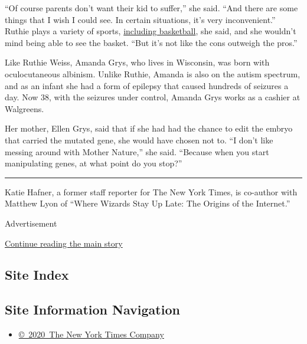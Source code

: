 ``Of course parents don't want their kid to suffer,'' she said. ``And
there are some things that I wish I could see. In certain situations,
it's very inconvenient.'' Ruthie plays a variety of sports,
\href{https://twitter.com/ethanjweiss/status/1056641212256477184?lang=en}{including
basketball}, she said, and she wouldn't mind being able to see the
basket. ``But it's not like the cons outweigh the pros.''

Like Ruthie Weiss, Amanda Grys, who lives in Wisconsin, was born with
oculocutaneous albinism. Unlike Ruthie, Amanda is also on the autism
spectrum, and as an infant she had a form of epilepsy that caused
hundreds of seizures a day. Now 38, with the seizures under control,
Amanda Grys works as a cashier at Walgreens.

Her mother, Ellen Grys, said that if she had had the chance to edit the
embryo that carried the mutated gene, she would have chosen not to. ``I
don't like messing around with Mother Nature,'' she said. ``Because when
you start manipulating genes, at what point do you stop?''

\begin{center}\rule{0.5\linewidth}{\linethickness}\end{center}

Katie Hafner, a former staff reporter for The New York Times, is
co-author with Matthew Lyon of ``Where Wizards Stay Up Late: The Origins
of the Internet.''

Advertisement

\protect\hyperlink{after-bottom}{Continue reading the main story}

\hypertarget{site-index}{%
\subsection{Site Index}\label{site-index}}

\hypertarget{site-information-navigation}{%
\subsection{Site Information
Navigation}\label{site-information-navigation}}

\begin{itemize}
\tightlist
\item
  \href{https://help.nytimes.com/hc/en-us/articles/115014792127-Copyright-notice}{©~2020~The
  New York Times Company}
\end{itemize}

